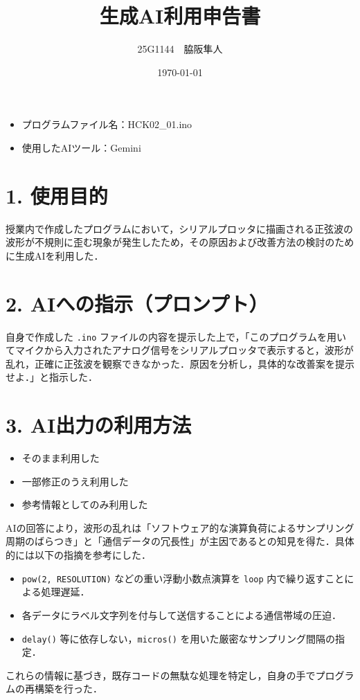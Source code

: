 \documentclass[uplatex]{jsarticle}
\title{生成AI利用申告書}
\author{25G1144　脇阪隼人}
\date{\today}
\begin{document}
\maketitle

\begin{itemize}
  \item プログラムファイル名：HCK02\_01.ino
  \item 使用したAIツール：Gemini
\end{itemize}

\section*{1. 使用目的}
授業内で作成したプログラムにおいて，シリアルプロッタに描画される正弦波の波形が不規則に歪む現象が発生したため，その原因および改善方法の検討のために生成AIを利用した．

\section*{2. AIへの指示（プロンプト）}
自身で作成した \texttt{.ino} ファイルの内容を提示した上で，「このプログラムを用いてマイクから入力されたアナログ信号をシリアルプロッタで表示すると，波形が乱れ，正確に正弦波を観察できなかった．原因を分析し，具体的な改善案を提示せよ．」と指示した．

\section*{3. AI出力の利用方法}
\begin{itemize}
    \renewcommand{\labelitemi}{} 
    \item \Square そのまま利用した
    \item \Square 一部修正のうえ利用した
    \item \CheckedBox 参考情報としてのみ利用した
\end{itemize}
AIの回答により，波形の乱れは「ソフトウェア的な演算負荷によるサンプリング周期のばらつき」と「通信データの冗長性」が主因であるとの知見を得た．具体的には以下の指摘を参考にした．
\begin{itemize}
	\item \texttt{pow(2, RESOLUTION)} などの重い浮動小数点演算を \texttt{loop} 内で繰り返すことによる処理遅延．
	\item 各データにラベル文字列を付与して送信することによる通信帯域の圧迫．
	\item \texttt{delay()} 等に依存しない，\texttt{micros()} を用いた厳密なサンプリング間隔の指定．
\end{itemize}
これらの情報に基づき，既存コードの無駄な処理を特定し，自身の手でプログラムの再構築を行った．
\end{document}
